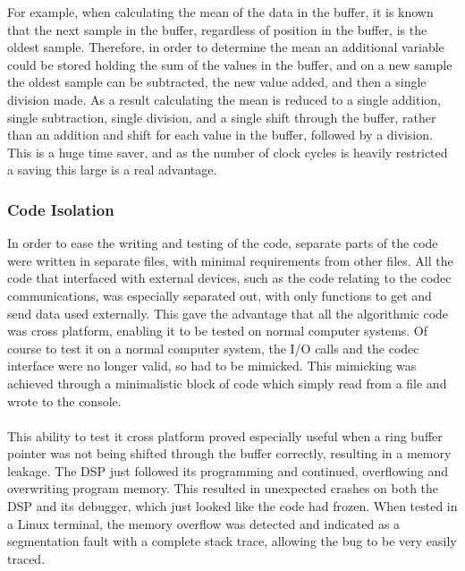 For example, when calculating the mean of the data in the buffer, it is known that the next sample in the buffer, regardless of position in the buffer, is the oldest sample.
Therefore, in order to determine the mean an additional variable could be stored holding the sum of the values in the buffer, and on a new sample the oldest sample can be subtracted, the new value added, and then a single division made.
As a result calculating the mean is reduced to a single addition, single subtraction, single division, and a single shift through the buffer, rather than an addition and shift for each value in the buffer, followed by a division.
This is a huge time saver, and as the number of clock cycles is heavily restricted a saving this large is a real advantage.

\subsubsection{Code Isolation}
In order to ease the writing and testing of the code, separate parts of the code were written in separate files, with minimal requirements from other files.
All the code that interfaced with external devices, such as the code relating to the codec communications, was especially separated out, with only functions
to get and send data used externally.
This gave the advantage that all the algorithmic code was cross platform, enabling it to be tested on normal computer systems.
Of course to test it on a normal computer system, the I/O calls and the codec interface were no longer valid, so had to be mimicked.
This mimicking was achieved through a minimalistic block of code which simply read from a file and wrote to the console.
\\
\\
This ability to test it cross platform proved especially useful when a ring buffer pointer was not being shifted through the buffer correctly, resulting in a memory leakage.
The DSP just followed its programming and continued, overflowing and overwriting program memory.
This resulted in unexpected crashes on both the DSP and its debugger, which just looked like the code had frozen.
When tested in a Linux terminal, the memory overflow was detected and indicated as a segmentation fault with a complete stack trace, allowing the bug to be very easily traced.

